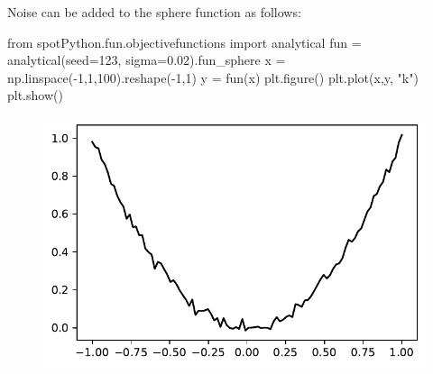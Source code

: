 \documentclass[
  letterpaper,
  DIV=11,
  numbers=noendperiod]{scrreprt}
\newenvironment{Shaded}{\begin{snugshade}}{\end{snugshade}}
\newcommand{\DecValTok}[1]{\textcolor[rgb]{0.68,0.00,0.00}{#1}}
\newcommand{\FloatTok}[1]{\textcolor[rgb]{0.68,0.00,0.00}{#1}}
\newcommand{\ImportTok}[1]{\textcolor[rgb]{0.00,0.46,0.62}{#1}}
\newcommand{\NormalTok}[1]{\textcolor[rgb]{0.00,0.23,0.31}{#1}}
\newcommand{\OperatorTok}[1]{\textcolor[rgb]{0.37,0.37,0.37}{#1}}
\newcommand{\StringTok}[1]{\textcolor[rgb]{0.13,0.47,0.30}{#1}}
\begin{document}
\begin{tcolorbox}[enhanced jigsaw, opacityback=0, left=2mm, title=\textcolor{quarto-callout-note-color}{\faInfo}\hspace{0.5em}{Example: The sphere function with noise}, bottomrule=.15mm, titlerule=0mm, arc=.35mm, leftrule=.75mm, colbacktitle=quarto-callout-note-color!10!white, bottomtitle=1mm, opacitybacktitle=0.6, coltitle=black, colframe=quarto-callout-note-color-frame, toprule=.15mm, breakable, colback=white, toptitle=1mm, rightrule=.15mm]

Noise can be added to the sphere function as follows:

\begin{Shaded}
\begin{Highlighting}[]
\ImportTok{from}\NormalTok{ spotPython.fun.objectivefunctions }\ImportTok{import}\NormalTok{ analytical}
\NormalTok{fun }\OperatorTok{=}\NormalTok{ analytical(seed}\OperatorTok{=}\DecValTok{123}\NormalTok{, sigma}\OperatorTok{=}\FloatTok{0.02}\NormalTok{).fun\_sphere}
\NormalTok{x }\OperatorTok{=}\NormalTok{ np.linspace(}\OperatorTok{{-}}\DecValTok{1}\NormalTok{,}\DecValTok{1}\NormalTok{,}\DecValTok{100}\NormalTok{).reshape(}\OperatorTok{{-}}\DecValTok{1}\NormalTok{,}\DecValTok{1}\NormalTok{)}
\NormalTok{y }\OperatorTok{=}\NormalTok{ fun(x)}
\NormalTok{plt.figure()}
\NormalTok{plt.plot(x,y, }\StringTok{"k"}\NormalTok{)}
\NormalTok{plt.show()}
\end{Highlighting}
\end{Shaded}

\begin{figure}[H]

{\centering \includegraphics{013_num_spot_noisy_files/figure-pdf/cell-4-output-1.pdf}

}

\end{figure}

\end{tcolorbox}
\end{document}
